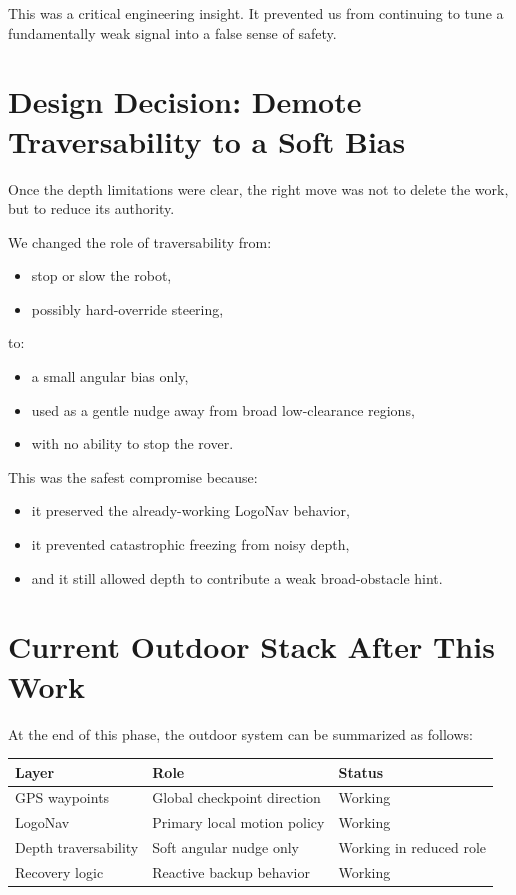 \documentclass[11pt]{article}
\begin{document}
This was a critical engineering insight. It prevented us from continuing to tune a fundamentally weak signal into a false sense of safety.

\section{Design Decision: Demote Traversability to a Soft Bias}
Once the depth limitations were clear, the right move was not to delete the work, but to reduce its authority.

We changed the role of traversability from:
\begin{itemize}[leftmargin=*]
\item stop or slow the robot,
\item possibly hard-override steering,
\end{itemize}
to:
\begin{itemize}[leftmargin=*]
\item a small angular bias only,
\item used as a gentle nudge away from broad low-clearance regions,
\item with no ability to stop the rover.
\end{itemize}

This was the safest compromise because:
\begin{itemize}[leftmargin=*]
\item it preserved the already-working LogoNav behavior,
\item it prevented catastrophic freezing from noisy depth,
\item and it still allowed depth to contribute a weak broad-obstacle hint.
\end{itemize}

\section{Current Outdoor Stack After This Work}
At the end of this phase, the outdoor system can be summarized as follows:

\begin{longtable}{p{} p{} p{}}
\toprule
\textbf{Layer} & \textbf{Role} & \textbf{Status} \\
\midrule
GPS waypoints & Global checkpoint direction & Working \\
LogoNav & Primary local motion policy & Working \\
Depth traversability & Soft angular nudge only & Working in reduced role \\
Recovery logic & Reactive backup behavior & Working \\
\bottomrule
\end{longtable}
\end{document}
